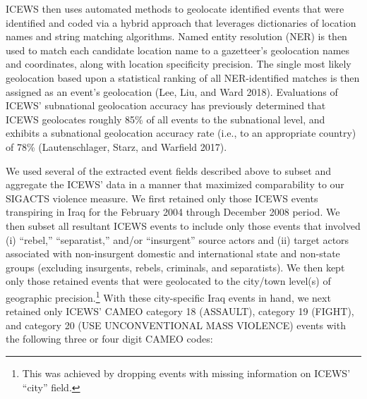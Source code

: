 \documentclass[12pt]{article}
\begin{document}
ICEWS then uses automated methods to geolocate identified events that were identified and coded via a hybrid approach that leverages  dictionaries of location names and string matching algorithms. Named entity resolution (NER) is then used to match each candidate location name to a gazetteer's geolocation names and coordinates, along with location specificity precision. The single most likely geolocation based upon a statistical ranking of all NER-identified matches is then assigned as an event's geolocation (Lee, Liu, and Ward 2018). Evaluations of ICEWS' subnational geolocation accuracy has previously determined that ICEWS geolocates roughly 85\% of all events to the subnational level, and exhibits a subnational geolocation accuracy rate (i.e., to an appropriate country) of 78\% (Lautenschlager, Starz, and Warfield 2017).

We used several of the extracted event fields described above to subset and aggregate the ICEWS' data in a manner that maximized comparability to our SIGACTS violence measure. We first retained only those ICEWS events transpiring in Iraq for the February 2004 through December 2008 period. We then subset all resultant ICEWS events to include only those events that involved (i) ``rebel,'' ``separatist,'' and/or ``insurgent'' source actors and (ii) target actors associated with non-insurgent domestic and international state and non-state groups (excluding insurgents, rebels, criminals, and separatists). We then kept only those retained events that were geolocated to the city/town level(s) of geographic precision.\footnote{This was achieved by dropping events with missing information on ICEWS' ``city'' field.}  With these city-specific Iraq events in hand, we next retained only ICEWS' CAMEO category 18 (ASSAULT), category 19 (FIGHT), and category 20 (USE UNCONVENTIONAL MASS VIOLENCE) events with the following three or four digit CAMEO codes:\\
\end{document}

